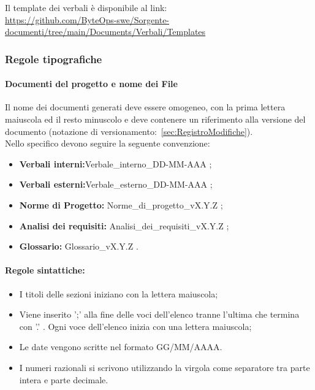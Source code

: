 \documentclass{article}
\begin{document}
Il template dei verbali è disponibile al link:\\ \href{https://github.com/ByteOps-swe/Sorgente-documenti/tree/main/Documents/Verbali/Templates}{https://github.com/ByteOps-swe/Sorgente-documenti/tree/main/Documents/Verbali/Templates}



\subsubsection{Regole tipografiche}
\paragraph*{Documenti del progetto e nome dei File}\label{sec:NomeFile}
Il nome dei documenti generati deve essere omogeneo, con la prima lettera maiuscola ed il resto minuscolo e deve contenere un riferimento alla versione del documento (notazione di versionamento:~\ref{sec:RegistroModifiche}).\\
Nello specifico devono seguire la seguente convenzione:
\begin{itemize}
    \item \textbf{Verbali interni:}Verbale\_interno\_DD-MM-AAA ;
    \item \textbf{Verbali esterni:}Verbale\_esterno\_DD-MM-AAA ;
    \item \textbf{Norme di Progetto:} Norme\_di\_progetto\_vX.Y.Z ;
    \item \textbf{Analisi dei requisiti:} Analisi\_dei\_requisiti\_vX.Y.Z ;
    \item \textbf{Glossario:} Glossario\_vX.Y.Z .
\end{itemize}

\paragraph*{Regole sintattiche:}
\begin{itemize}
    \item I titoli delle sezioni iniziano con la lettera maiuscola;
    \item Viene inserito ';' alla fine delle voci dell'elenco tranne l'ultima che termina con '.' . Ogni voce dell'elenco inizia con una lettera maiuscola;
    \item  Le date vengono scritte nel formato GG/MM/AAAA.
    \item  I numeri razionali si scrivono utilizzando la virgola come separatore tra parte intera e parte decimale.
\end{itemize}
\end{document}
